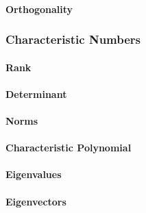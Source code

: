 
\paragraph{Orthogonality}



\subsubsection{Characteristic Numbers}

\paragraph{Rank}

\paragraph{Determinant}

\paragraph{Norms}




\paragraph{Characteristic Polynomial}

\paragraph{Eigenvalues}

\paragraph{Eigenvectors}

